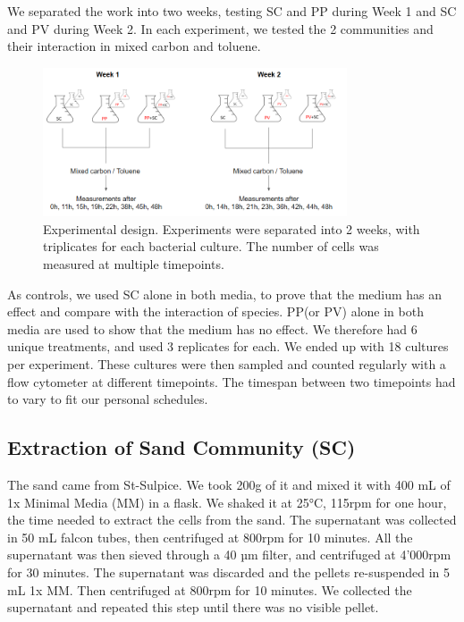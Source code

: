 \documentclass[a4paper, 10pt, conference]{ieeeconf}   %
\begin{document}
We separated the work into two weeks, testing SC and PP during Week 1 and SC and PV during Week 2. In each experiment, we tested the 2 communities and their interaction in mixed carbon and toluene.

\begin{figure}[H]

	  
		\includegraphics[width=9cm]{erlenmeyer.PNG}
		\caption{Experimental design. Experiments were separated into 2 weeks, with triplicates for each bacterial culture. The number of cells was measured at multiple timepoints.}
		\label{design_weeks}
	
\end{figure}

As controls, we used SC alone in both media, to prove that the medium has an effect and compare with the interaction of species. PP(or PV) alone in both media are used to show that the medium has no effect.
We therefore had 6 unique treatments, and used 3 replicates for each. We ended up with 18 cultures per experiment. These cultures were then sampled and counted regularly with a flow cytometer at different timepoints. The timespan between two timepoints had to vary to fit our personal schedules.


\subsection{Extraction of Sand Community (SC)}
The sand came from St-Sulpice. We took 200g of it and mixed it with 400 mL of 1x Minimal Media (MM) in a flask. We shaked it at 25°C, 115rpm for one hour, the time needed to extract the cells from the sand. The supernatant was collected in 50 mL falcon tubes, then centrifuged at 800rpm for 10 minutes. All the supernatant was then sieved through a 40 µm filter, and centrifuged at 4’000rpm for 30 minutes. The supernatant was discarded and the pellets re-suspended in 5 mL 1x MM. Then centrifuged at 800rpm for 10 minutes. We collected the supernatant and repeated this step until there was no visible pellet.
\end{document}
